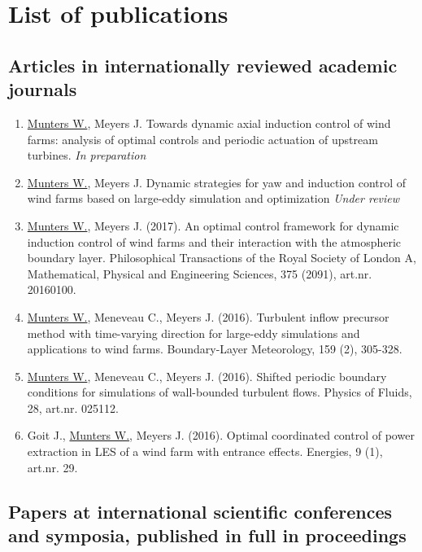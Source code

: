 \chapter{List of publications}

\section*{Articles in internationally reviewed academic journals}

\begin{enumerate}
	
\item \underline{Munters W.}, Meyers J. Towards dynamic axial induction control of wind farms: analysis of optimal controls and periodic actuation of upstream turbines. \emph{In preparation}	
	
\item \underline{Munters W.}, Meyers J. Dynamic strategies for yaw and induction control of wind farms based on large-eddy simulation and optimization \emph{Under review}

\item \underline{Munters W.}, Meyers J. (2017). An optimal control framework for dynamic induction control of wind farms and their interaction with the atmospheric boundary layer. Philosophical Transactions of the Royal Society of London A, Mathematical, Physical and Engineering Sciences, 375 (2091), art.nr. 20160100.

\item \underline{Munters W.}, Meneveau C., Meyers J. (2016). Turbulent inflow precursor method with time-varying direction for large-eddy simulations and applications to wind farms. Boundary-Layer Meteorology, 159 (2), 305-328.

\item \underline{Munters W.}, Meneveau C., Meyers J. (2016). Shifted periodic boundary conditions for simulations of wall-bounded turbulent flows. Physics of Fluids, 28, art.nr. 025112.

\item Goit J., \underline{Munters W.}, Meyers J. (2016). Optimal coordinated control of power extraction in LES of a wind farm with entrance effects. Energies, 9 (1), art.nr. 29.
\end{enumerate}


\section*{Papers at international scientific conferences and symposia, published in full in proceedings}

